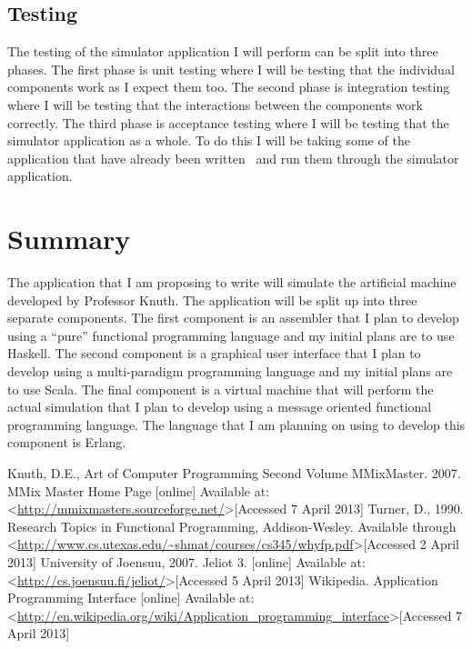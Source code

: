 \documentclass[11pt]{article} %
\begin{document}
\subsection{Testing}
The testing of the simulator application I will perform can be split into three phases. The first phase is unit testing where I will be testing that the individual components work as I expect them too. The second phase is integration testing where I will be testing that the interactions between the components work correctly. The third phase is acceptance testing where I will be testing that the simulator application as a whole. To do this I will be taking some of the application that have already been written~\cite{ref:mmixmaster} and run them through the simulator application. 
\section{Summary}
The application that I am proposing to write will simulate the artificial machine developed by Professor Knuth\cite{knuth:aocp1}. The application will be split up into three separate components. The first component is an assembler that I plan to develop using a ``pure'' functional programming language and my initial plans are to use Haskell. The second component is a graphical user interface that I plan to develop using a multi-paradigm programming language and my initial plans are to use Scala. The final component is a virtual machine that will perform the actual simulation that I plan to develop using a message oriented functional programming language. The language that I am planning on using to develop this component is Erlang.
\begin{thebibliography}{99}
	Knuth, D.E., Art of Computer Programming
	Second Volume
	MMixMaster. 2007. MMix Master Home Page [online] Available at: \textless\url{http://mmixmasters.sourceforge.net/}\textgreater [Accessed 7 April 2013]
	Turner, D., 1990. Research Topics in Functional Programming, Addison-Wesley. Available through \textless \url{http://www.cs.utexas.edu/~shmat/courses/cs345/whyfp.pdf}\textgreater [Accessed 2 April 2013]
	University of Joensuu, 2007. Jeliot 3. [online] Available at: \textless\url{http://cs.joensuu.fi/jeliot/}\textgreater [Accessed 5 April 2013]
	Wikipedia. Application Programming Interface [online] Available at: \textless\url{http://en.wikipedia.org/wiki/Application_programming_interface}\textgreater [Accessed 7 April 2013]
\end{thebibliography}
\end{document}
